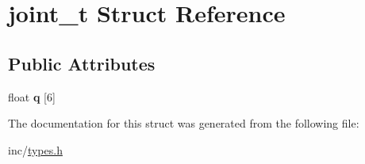 \hypertarget{structjoint__t}{\section{joint\-\_\-t Struct Reference}
\label{structjoint__t}
}
\subsection*{Public Attributes}
\begin{DoxyCompactItemize}
\item 
\hypertarget{structjoint__t_abb9c960488494cf1a65e4b8221ab893f}{float {\bfseries q} \mbox{[}6\mbox{]}}\label{structjoint__t_abb9c960488494cf1a65e4b8221ab893f}

\end{DoxyCompactItemize}


The documentation for this struct was generated from the following file\-:\begin{DoxyCompactItemize}
\item 
inc/\hyperlink{types_8h}{types.\-h}\end{DoxyCompactItemize}
